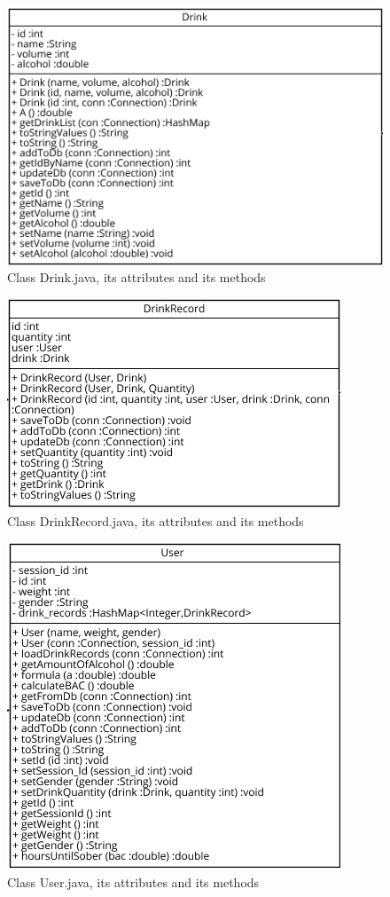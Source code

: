 \begin{figure}[H]
\centering
   \includegraphics{./figures/drink.png}
   \caption{Class Drink.java, its attributes and its methods}
   \label{fig:drinkJava}
\end{figure}

\begin{figure}[H]
\centering
   \includegraphics{./figures/drinkRecord.png}
   \caption{Class DrinkRecord.java, its attributes and its methods}
   \label{fig:drinkRecordJava}
\end{figure}

\begin{figure}[H]
\centering
   \includegraphics{./figures/user.png}
   \caption{Class User.java, its attributes and its methods}
   \label{fig:userJava}
\end{figure} 

